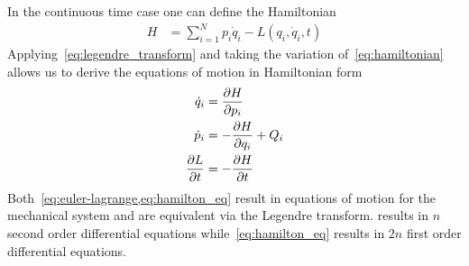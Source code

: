 \documentclass[letterpaper, preprint, paper,11pt]{AAS}	%
\begin{document}
In the continuous time case one can define the Hamiltonian
\begin{align}\label{eq:hamiltonian}
	H &= \sum_{i = 1}^N p_i \dot{q}_i - L \left( q_i,\dot{q}_i, t \right)
\end{align}
Applying~\cref{eq:legendre_transform} and taking the variation of~\cref{eq:hamiltonian} allows us to derive the equations of motion in Hamiltonian form
\begin{subequations}
\begin{align}\label{eq:hamilton_eq}
	\dot{q}_i &= \deriv{H}{p_i} \\
	\dot{p}_i &= - \deriv{H}{q_i} + Q_i \\
	\deriv{L}{t} &= -\deriv{H}{t}
\end{align}
\end{subequations}
Both~\cref{eq:euler-lagrange,eq:hamilton_eq} result in equations of motion for the mechanical system and are equivalent via the Legendre transform.
 results in \( n \) second order differential equations while~\cref{eq:hamilton_eq} results in \( 2n \) first order differential equations.
\end{document}
